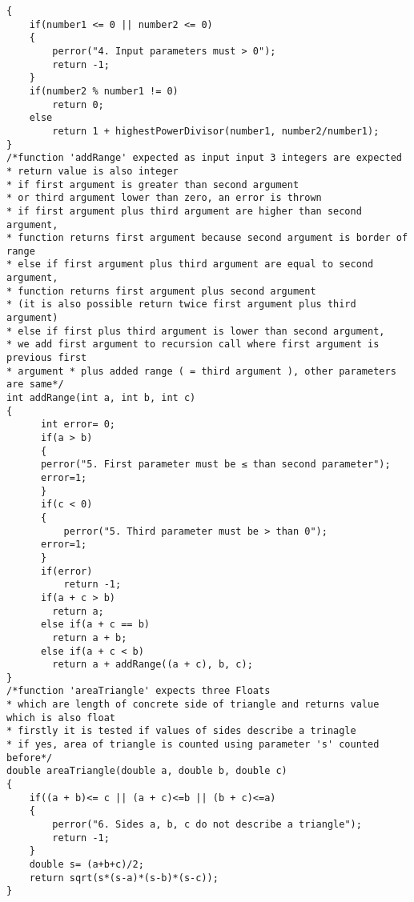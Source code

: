 \documentclass[4pt]{article}
\begin{document}
\begin{verbatim}
{
    if(number1 <= 0 || number2 <= 0) 
    {
        perror("4. Input parameters must > 0");
        return -1;
    }
    if(number2 % number1 != 0)
        return 0;
    else
        return 1 + highestPowerDivisor(number1, number2/number1);
}
/*function 'addRange' expected as input input 3 integers are expected
* return value is also integer
* if first argument is greater than second argument
* or third argument lower than zero, an error is thrown
* if first argument plus third argument are higher than second argument,
* function returns first argument because second argument is border of range
* else if first argument plus third argument are equal to second argument,
* function returns first argument plus second argument
* (it is also possible return twice first argument plus third argument)
* else if first plus third argument is lower than second argument,
* we add first argument to recursion call where first argument is previous first
* argument * plus added range ( = third argument ), other parameters are same*/
int addRange(int a, int b, int c)
{
      int error= 0;
      if(a > b) 
      {
      perror("5. First parameter must be ≤ than second parameter");
      error=1;
      }
      if(c < 0)
      {
          perror("5. Third parameter must be > than 0");
      error=1;
      }
      if(error)
          return -1;
      if(a + c > b)
        return a;
      else if(a + c == b) 
        return a + b;
      else if(a + c < b)
        return a + addRange((a + c), b, c);
}
/*function 'areaTriangle' expects three Floats
* which are length of concrete side of triangle and returns value which is also float
* firstly it is tested if values of sides describe a trinagle
* if yes, area of triangle is counted using parameter 's' counted before*/
double areaTriangle(double a, double b, double c)
{
    if((a + b)<= c || (a + c)<=b || (b + c)<=a)
    {
        perror("6. Sides a, b, c do not describe a triangle");
        return -1;
    }
    double s= (a+b+c)/2;
    return sqrt(s*(s-a)*(s-b)*(s-c));
}
\end{verbatim}
\end{document}
